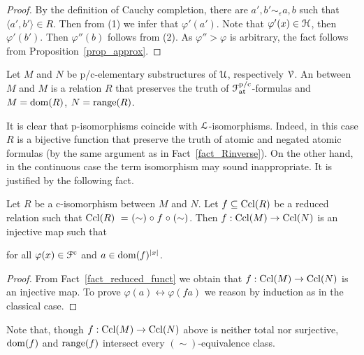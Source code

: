 \documentclass{amsproc}
\renewcommand*{\emph}[1]{%
   \smash{\tikz[baseline]\node[rectangle, fill=teal!25, rounded corners, inner xsep=0.5ex, inner ysep=0.2ex, anchor=base, minimum height = 2.7ex]{\strut #1};}}
\begin{document}
{\begin{proof}

  By the definition of Cauchy completion, there are $a',b'\sim_\varepsilon a,b$ such that $\langle a',b'\rangle\in R$.
  Then from (1) we infer that $\varphi'(a')$.
  Note that $\varphi'(x)\in{\EuScript H}$, then $\varphi'(b')$. 
  Then $\varphi''(b)$ follows from (2).
  As $\varphi''>\varphi$ is arbitrary, the fact follows from Proposition~\ref{prop_approx}.
\end{proof}

\begin{definition}\label{def_ciso}
  Let $M$ and $N$ be p/c-elementary substructures of ${\EuScript U}$, respectively ${\EuScript V}$.
  An \emph{p/c-isomorphism\/} between $M$ and $M$ is a relation $R$ that preserves the truth of ${\EuScript F}^{\rm p/c}_{\rm at}$-formulas and $M={\rm dom}(R)$,  $N={\rm range}(R)$.
\end{definition}

 It is clear that p-isomorphisms coincide with ${\EuScript L}$-isomorphisms. 
 Indeed, in this case $R$ is a bijective function that preserve the truth of atomic and negated atomic formulas (by the same argument as in Fact~\ref{fact_Rinverse}).
 On the other hand, in the continuous case the term isomorphism may sound inappropriate.
 It is justified by the following fact.

\begin{fact}\label{fact_c_iso}
  Let $R$ be a c-isomorphism between $M$ and $N$.
  Let $f\subseteq{\rm Ccl}(R)$ be a reduced relation such that ${\rm Ccl}(R)\ =\ \mathrel{(\sim)}\circ \mathrel{f}\circ\mathrel{(\sim)}$.
  Then $f:{\rm Ccl}(M)\rightarrow{\rm Ccl}(N)$ is an injective map such that 
  
  \hfill for all $\varphi(x)\in{\EuScript F}^{\rm c}$ and $a\in{\rm dom}(f)^{|x|}$.
\end{fact}

\begin{proof}
  From Fact~\ref{fact_reduced_funct} we obtain that $f:{\rm Ccl}(M)\rightarrow{\rm Ccl}(N)$ is an injective map.
  To prove $\varphi(a)\leftrightarrow\varphi(fa)$ we reason by induction as in the classical case.
\end{proof}

Note that, though $f:{\rm Ccl}(M)\rightarrow{\rm Ccl}(N)$ above is neither total nor surjective, ${\rm dom}(f)$ and ${\rm range}(f)$ intersect every $(\sim)$-equivalence class.

}
\end{document}

